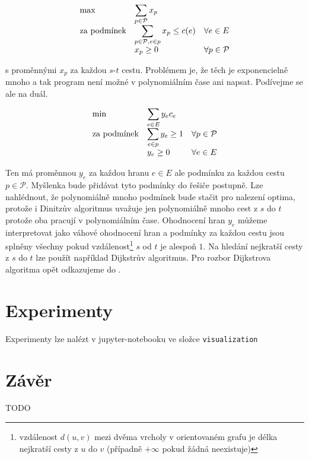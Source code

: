 \documentclass{article}
\theoremstyle{plain}
\theoremstyle{definition}
\begin{document}
\begin{equation}\label{exp_lp}
\begin{array}{ll@{}ll}
\text{max} & \displaystyle\sum_{p\in\mathcal{P}}x_p  &\\
\text{za podmínek}& \displaystyle\sum_{p\in\mathcal{P},e\in p} x_p \leq c(e)  & & \forall e \in E\\
& x_p\geq 0 & & \forall p \in \mathcal{P}
\end{array}
\end{equation}

s proměnnými $x_p$ za každou $s$-$t$ cestu. Problémem je, že těch je exponencielně mnoho a tak program není možné v polynomiálním čase ani napsat. Podívejme se ale na duál.

\begin{equation}\label{dual_exp}
\begin{array}{ll@{}ll}
\text{min} & \displaystyle\sum_{e\in E}y_ec_e &\\
\text{za podmínek}& \displaystyle \sum_{e\in p}y_e \geq 1 & & \forall p\in\mathcal{P}\\
&y_e \geq 0& & \forall e \in E
\end{array}
\end{equation}

Ten má proměnnou $y_e$ za každou hranu $e\in E$ ale podmínku za každou cestu $p\in \mathcal{P}$. Myšlenka bude přidávat tyto podmínky do řešiče postupně. Lze nahlédnout, že polynomiálně mnoho podmínek bude stačit pro nalezení optima, protože i Dinitzův algoritmus uvažuje jen polynomiálně mnoho cest z $s$ do $t$ protože oba pracují v polynomiálním čase. Ohodnocení hran $y_e$ můžeme interpretovat jako váhové ohodnocení hran a podmínky za každou cestu jsou splněny všechny pokud vzdálenost\footnote{vzdálenost $d(u,v)$ mezi dvěma vrcholy v orientovaném grafu je délka nejkratší cesty z $u$ do $v$ (případně $+\infty$ pokud žádná neexistuje)} $s$ od $t$ je alespoň $1$. Na hledání nejkratší cesty z $s$ do $t$ lze použít například Dijkstrův algoritmus. Pro rozbor Dijkstrova algoritma opět odkazujeme do \cite{labyrint}.

\section{Experimenty}
Experimenty lze nalézt v jupyter-notebooku ve složce {\tt visualization}

\section{Závěr}
TODO



\end{document}

